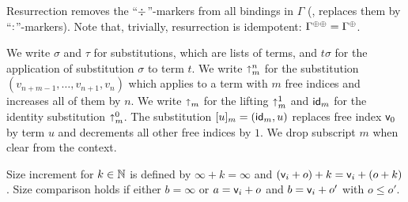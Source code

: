 \documentclass[acmlarge,review,anonymous]{acmart}\settopmatter{printfolios=true}
\begin{document}
Resurrection\cite{pfenning:lics01} \fbox{$\resurrect\Gamma$} removes
the ``$\mathord{\div}$''-markers from all bindings in $\Gamma$ (\ie, replaces
them by ``$\mathord{:}$''-markers).  Note that, trivially, resurrection is idempotent: $\resurrecttwice\Gamma = \resurrect{\Gamma}$.

We write $\sigma$ and $\tau$ for substitutions, which are lists of terms, and $t \sigma$ for the application of substitution $\sigma$ to term $t$.  We write $\mathord{\shortuparrow}^n_m$ for the substitution $(v_{n+m-1},\dots,v_{n+1},v_n)$ which applies to a term with $m$ free indices and increases all of them by $n$.  We write $\mathord{\shortuparrow}_m$ for the lifting $\mathord{\shortuparrow}^1_m$ and $\mathsf{id}_m$ for the identity substitution $ \mathord{\shortuparrow}^0_m$. The substitution $[u]_m = (\mathsf{id}_m, u)$ replaces free index $\mathsf{v}_{0}$ by term $u$ and decrements all other free indices by $1$. We drop subscript $m$ when clear from the context.

Size increment  for $k \in \mathbb{N}$ is defined by $\infty + k = \infty$ and $(\mathsf{v}_{i} + o) + k = \mathsf{v}_{i} + (o + k)$.  Size comparison  holds if either $b = \infty$ or $a = \mathsf{v}_{i} + o$ and $b = \mathsf{v}_{i} + o'$ with $o \leq o'$.
\end{document}

